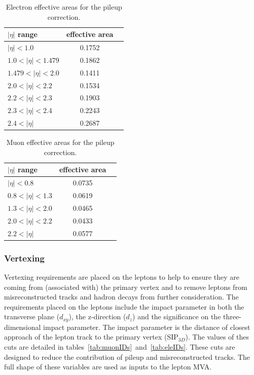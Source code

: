 \begin{table}[hbtp]
\centering
\caption[Electron effective areas for the pileup correction.]{Electron effective areas for the pileup correction.}
\begin{tabular}{lcc}
\hline
$|\eta|$ range & effective area \\
\hline
$|\eta| < 1.0$ & 0.1752 \\
$1.0 < |\eta| < 1.479$ & 0.1862 \\
$1.479 < |\eta| < 2.0$ & 0.1411 \\
$2.0 < |\eta| < 2.2$ & 0.1534 \\
$2.2 < |\eta| < 2.3$ & 0.1903 \\
$2.3 < |\eta| < 2.4$ & 0.2243 \\
$2.4 < |\eta|$ & 0.2687 \\
\hline
\end{tabular}
\label{tab:ele_effArea}
\end{table}

\begin{table}[hbtp]
\centering
\caption[Muon effective areas for the pileup correction.]{Muon effective areas for the pileup correction.}
\begin{tabular}{lcc}
\hline
$|\eta|$ range & effective area \\
\hline
$|\eta| < 0.8$ & 0.0735 \\
$0.8 < |\eta| < 1.3$ & 0.0619 \\
$1.3 < |\eta| < 2.0$ & 0.0465 \\
$2.0 < |\eta| < 2.2$ & 0.0433 \\
$2.2 < |\eta|$ & 0.0577 \\
\hline
\end{tabular}
\label{tab:mu_effArea}
\end{table}

\subsubsection{Vertexing}
Vertexing requirements are placed on the leptons to help to ensure they are coming from (associated with) the primary vertex and to
remove leptons from misreconstructed tracks and hadron decays from further consideration. The requirements
placed on the leptons include the impact parameter in both the transverse plane ($d_{xy}$), the z-direction ($d_{z}$) and the significance
on the three-dimensional impact parameter. The impact parameter is the distance of closest approach of the lepton track to the primary vertex
(SIP$_{3D}$). The values of thes cuts are detailed in tables~\ref{tab:muonIDs}~and~\ref{tab:eleIDs}.
These cuts are designed to reduce the contribution of pileup and misreconstructed tracks. The full shape of these variables are
used as inputs to the lepton MVA.

